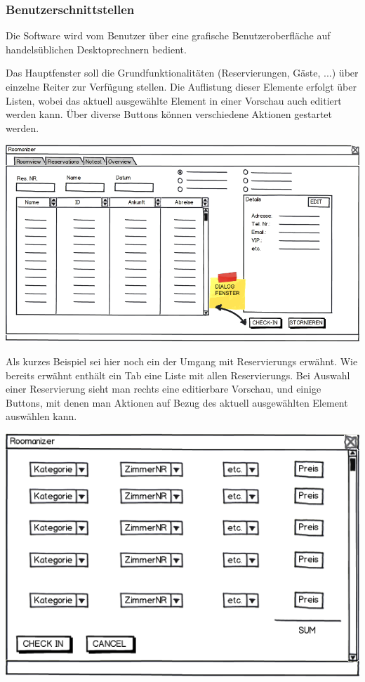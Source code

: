 \documentclass[10pt,a4paper,titlepage]{article}
\begin{document}
\subsubsection{Benutzerschnittstellen}
Die Software wird vom Benutzer über eine grafische Benutzeroberfläche auf handelsüblichen Desktoprechnern bedient.

Das Hauptfenster soll die Grundfunktionalitäten (Reservierungen, Gäste, ...) über einzelne Reiter zur Verfügung stellen. Die Auflistung dieser Elemente erfolgt über Listen, wobei das aktuell ausgewählte Element in einer Vorschau auch editiert werden kann. Über diverse Buttons können verschiedene Aktionen gestartet werden.

\includegraphics[width=\linewidth]{Images/GUI_Overview.png}

Als kurzes Beispiel sei hier noch ein der Umgang mit \Glspl{Reservierung} erwähnt. Wie bereits erwähnt enthält ein Tab eine Liste mit allen \Glspl{Reservierung}. Bei Auswahl einer \Gls{Reservierung} sieht man rechts eine editierbare Vorschau, und einige Buttons, mit denen man Aktionen auf Bezug des aktuell ausgewählten Element auswählen kann.

\includegraphics[width=\linewidth]{Images/GUI_Dialog.png}
\end{document}
